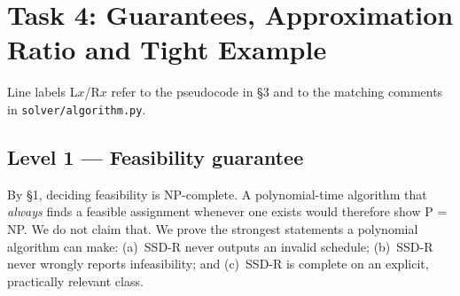 \section{Task 4: Guarantees, Approximation Ratio and Tight Example}

Line labels L$x$/R$x$ refer to the pseudocode in \S3 and to the matching
comments in \texttt{solver/algorithm.py}.

\subsection{Level 1 --- Feasibility guarantee}
By \S1, deciding feasibility is NP-complete. A polynomial-time algorithm
that \emph{always} finds a feasible assignment whenever one exists would
therefore show P = NP. We do not claim that. We prove the strongest
statements a polynomial algorithm can make: (a)~SSD-R never outputs an
invalid schedule; (b)~SSD-R never wrongly reports infeasibility; and
(c)~SSD-R is complete on an explicit, practically relevant class.


